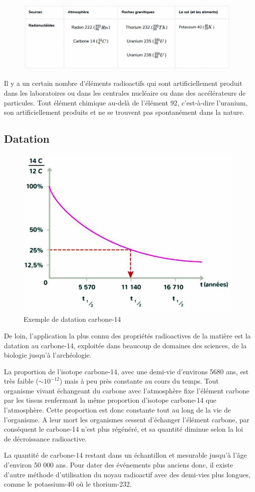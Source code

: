 \documentclass[11pt,a4paper]{article}
\begin{document}
\begin{figure}[h]
\centering
\includegraphics[width=0.75\linewidth]{imgs/p8/nautreradio.jpg}
\end{figure}

Il y a un certain nombre d'éléments radioactifs qui sont artificiellement produit dans les laboratoires ou dans les centrales nucléaire ou dans des accélérateurs de particules. Tout élément chimique au-delà de l'élément 92, c'est-à-dire l'uranium, son artificiellement produits et ne se trouvent pas spontanément dans la nature.

\subsection{Datation}

\begin{figure}
\centering
\includegraphics[width=0.95\linewidth]{imgs/p8/datation.jpg}
\caption{Exemple de datation carbone-14}
\end{figure} 
De loin, l'application la plus connu des propriétés radioactives de la matière est la datation au carbone-14, exploitée dans beaucoup de domaines des sciences, de la biologie jusqu'à l'archéologie.

La proportion de l'isotope carbone-14, avec une demi-vie d'environs 5680 ans, est très faible ($ \sim 10^{-12}$) mais à peu près constante au cours du temps. Tout organisme vivant échangeant du carbone avec l'atmosphère fixe l'élément carbone par les tissus renfermant la même proportion d'isotope carbone-14 que l'atmosphère. Cette proportion est donc constante tout au long de la vie de l'organisme. A leur mort les organismes cessent  d'échanger l'élément carbone, par conséquent le carbone-14 n'est plus régénéré, et sa quantité diminue selon la loi de décroissance radioactive.

La quantité de carbone-14 restant dans un échantillon et mesurable jusqu'à l'âge d'environ 50 000 ans. Pour dater des événements plus anciens donc, il existe d'autre méthode d'utilisation du noyau radioactif avec des demi-vies plus longues, comme le potassium-40 où le thorium-232.
\end{document}
